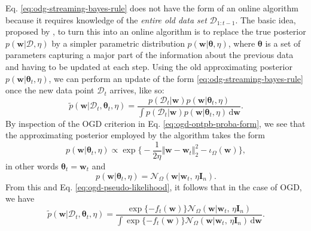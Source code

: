 Eq. \eqref{eq:odg-streaming-bayes-rule} does not have the form of an online algorithm because it requires knowledge of the \emph{entire old data set} $\mathcal{D}_{1:t-1}$. The basic idea, proposed by \citet{opper98}, to turn this into an online algorithm is to replace the true posterior $p(\mathbf{w}|\mathcal{D}, \eta)$ by a simpler parametric distribution $p(\mathbf{w}|\boldsymbol{\theta}, \eta)$, where $\boldsymbol{\theta}$ is a set of parameters capturing a major part of the information about the previous data and having to be updated at each step. Using the old approximating posterior $p(\mathbf{w}|\boldsymbol{\theta}_t, \eta)$, we can perform an update of the form \eqref{eq:odg-streaming-bayes-rule} once the new data point $\mathcal{D}_t$ arrives, like so:
\begin{equation}
	\widetilde{p}(\mathbf{w}|\mathcal{D}_t, \boldsymbol{\theta}_t, \eta)
	= \frac{p(\mathcal{D}_{t}|\mathbf{w})p(\mathbf{w}|\boldsymbol{\theta}_t, \eta)}
	{\int p(\mathcal{D}_{t}|\mathbf{w})p(\mathbf{w}|\boldsymbol{\theta}_t, \eta) \, \mathrm{d}\mathbf{w}}.
\end{equation}
By inspection of the OGD criterion in Eq. \eqref{eq:ogd-optpb-proba-form}, we see that the approximating posterior employed by the algorithm takes the form
\begin{equation}
	p(\mathbf{w}|\boldsymbol{\theta}_t, \eta)
	\propto \exp\Big\{-\frac{1}{2\eta}\Vert\mathbf{w} - \mathbf{w}_t\Vert_2^2 - \iota_{\Omega}(\mathbf{w})\Big\},
\end{equation}
in other words $\boldsymbol{\theta}_t = \mathbf{w}_t$ and
\begin{equation}
	p(\mathbf{w}|\boldsymbol{\theta}_t, \eta)
	= \mathcal{N}_{\Omega}(\mathbf{w}|\mathbf{w}_t,\, \eta\mathbf{I}_n).
\end{equation}
From this and Eq. \eqref{eq:ogd-pseudo-likelihood}, it follows that in the case of OGD, we have
\begin{equation}
\label{eq:ogd-approximate-posterior-derivation}
	\widetilde{p}(\mathbf{w}|\mathcal{D}_t, \boldsymbol{\theta}_t, \eta)
	= \frac{\exp\{-f_t(\mathbf{w})\}\mathcal{N}_{\Omega}(\mathbf{w}|\mathbf{w}_t,\, \eta\mathbf{I}_n)}{\int \exp\{-f_t(\mathbf{w})\}\mathcal{N}_{\Omega}(\mathbf{w}|\mathbf{w}_t,\, \eta\mathbf{I}_n) \, \mathrm{d}\mathbf{w}}.
\end{equation}

